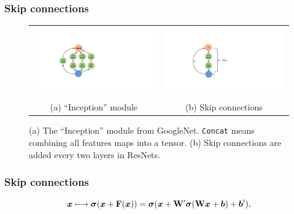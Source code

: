 \documentclass[presentation]{beamer}
\begin{document}
\begin{frame}
    \frametitle{Skip connections}
    \begin{figure}[htb!]
        \centering
        \begin{tabular}{cc}
        \includegraphics[scale = 0.5]{inception} & \includegraphics[scale = 0.5]{resnet2} \tabularnewline
        (a) ``Inception'' module & (b) Skip connections
        \end{tabular}
        \caption{(a) The ``Inception'' module from GoogleNet. \texttt{Concat} means combining all features maps into a tensor. (b) Skip connections are added every two layers in ResNets. }\label{fig:skip}
    \end{figure}

\end{frame}

\begin{frame}
    \frametitle{Skip connections}

    \begin{equation}\label{eq:mapsto}
        \text{\boldmath $x$} \longmapsto \bm{\sigma}(\text{\boldmath $x$} + \mathrm{\bf F}(\text{\boldmath $x$})) = \bm{\sigma}(\text{\boldmath $x$} + \mathrm{\bf W}' \bm{\sigma}(\mathrm{\bf W} \text{\boldmath $x$} + \text{\boldmath $b$}) + \text{\boldmath $b$}'),
    \end{equation}

\end{frame}
\end{document}
